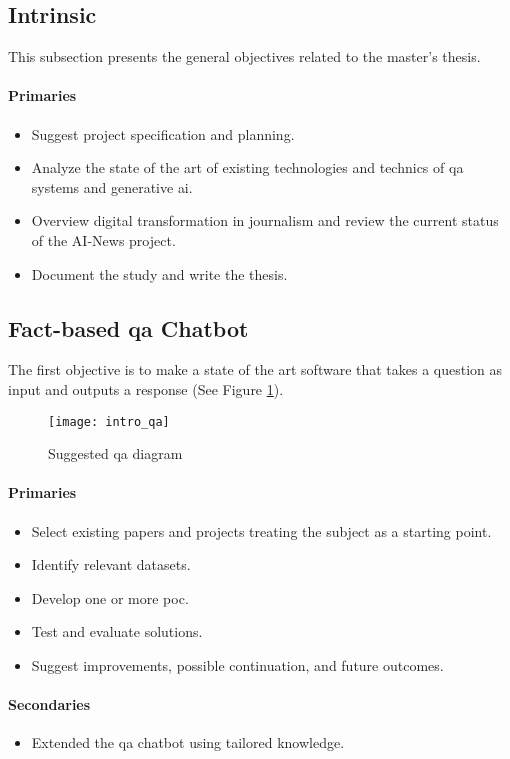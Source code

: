 \subsection*{Intrinsic}
This subsection presents the general objectives related to the master's thesis.
\paragraph{Primaries}
\begin{itemize}[noitemsep]
    \item Suggest project specification and planning.
    \item Analyze the state of the art of existing technologies and technics of \gls{qa} systems and generative \gls{ai}.
    \item Overview digital transformation in journalism and review the current status of the AI-News project.
    \item Document the study and write the thesis.
\end{itemize}

\subsection*{Fact-based \gls{qa} Chatbot}
The first objective is to make a state of the art software that takes a question as input and outputs a response (See Figure \ref{fig:spec_qa}).
\begin{figure}[ht!]
    \centering
    \texttt{[image: intro\_qa]}
    \caption{Suggested \gls{qa} diagram}
    \label{fig:spec_qa}
\end{figure}

\paragraph{Primaries}
\begin{itemize}[noitemsep]
    \item Select existing papers and projects treating the subject as a starting point.
    \item Identify relevant datasets.
    \item Develop one or more \gls{poc}.
    \item Test and evaluate solutions.
    \item Suggest improvements, possible continuation, and future outcomes.
\end{itemize}
\paragraph{Secondaries}
\begin{itemize}[noitemsep]
    \item Extended the \gls{qa} chatbot using tailored knowledge.
\end{itemize}


